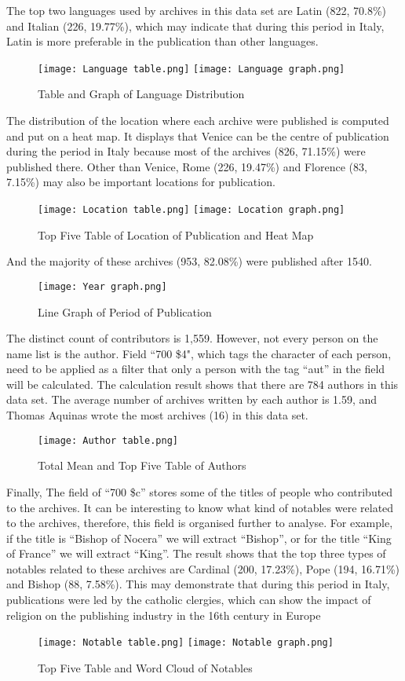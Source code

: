 \documentclass[11pt]{article}
\begin{document}
\noindent
The top two languages used by archives in this data set are Latin (822, 70.8\%) and Italian (226, 19.77\%), which may indicate that during this period in Italy, Latin is more preferable in the publication than other languages.
\begin{figure}[H]
\centering
\texttt{[image: Language table.png]}
\texttt{[image: Language graph.png]}
\caption{Table and Graph of Language Distribution}
\label{fig:plutchik}
\end{figure}
\noindent
The distribution of the location where each archive were published is computed and put on a heat map. It displays that Venice can be the centre of publication during the period in Italy because most of the archives (826, 71.15\%) were published there. Other than Venice, Rome (226, 19.47\%) and Florence (83, 7.15\%) may also be important locations for publication.
\begin{figure}[H]
\centering
\texttt{[image: Location table.png]}
\texttt{[image: Location graph.png]}
\caption{Top Five Table of Location of Publication and Heat Map}
\label{fig:plutchik}
\end{figure}
\noindent
And the majority of these archives (953, 82.08\%) were published after 1540.
\begin{figure}[H]
\centering
\texttt{[image: Year graph.png]}
\caption{Line Graph of Period of Publication}
\label{fig:plutchik}
\end{figure}
\noindent
The distinct count of contributors is 1,559. However, not every person on the name list is the author. Field “700 \$4", which tags the character of each person, need to be applied as a filter that only a person with the tag “aut” in the field will be calculated. The calculation result shows that there are 784 authors in this data set. The average number of archives written by each author is 1.59, and Thomas Aquinas wrote the most archives (16) in this data set.
\begin{figure}[H]
\centering
\texttt{[image: Author table.png]}
\caption{Total Mean and Top Five Table of Authors}
\label{fig:plutchik}
\end{figure}
\noindent
Finally, The field of “700 \$c” stores some of the titles of people who contributed to the archives. It can be interesting to know what kind of notables were related to the archives, therefore, this field is organised further to analyse. For example, if the title is “Bishop of Nocera” we will extract “Bishop”, or for the title “King of France” we will extract “King”. The result shows that the top three types of notables related to these archives are Cardinal (200, 17.23\%), Pope (194, 16.71\%) and Bishop (88, 7.58\%). This may demonstrate that during this period in Italy, publications were led by the catholic clergies, which can show the impact of religion on the publishing industry in the 16th century in Europe
\begin{figure}[H]
\centering
\texttt{[image: Notable table.png]}
\texttt{[image: Notable graph.png]}
\caption{Top Five Table and Word Cloud of Notables}
\label{fig:plutchik}
\end{figure}
\end{document}
